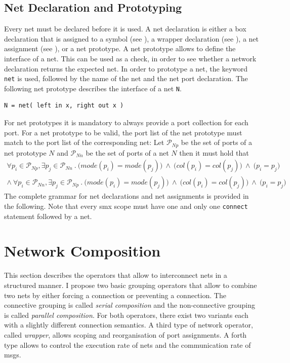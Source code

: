 \subsection{Net Declaration and Prototyping}
\label{sect_smx_nets_proto}
Every net must be declared before it is used.
A net declaration is either a box declaration that is assigned to a symbol (see \Sect{\ref{sect_smx_box}}), a wrapper declaration (see \Sect{\ref{sect_smx_network_wrapper}}), a net assignment (see \Sect{\ref{sect_smx_network_assign}}), or a net prototype.
A net prototype allows to define the interface of a net.
This can be used as a check, in order to see whether a network declaration returns the expected net.
In order to prototype a net, the keyword \texttt{net} is used, followed by the name of the net and the net port declaration.
The following net prototype describes the interface of a net \texttt{N}.
\begin{lstlisting}[numbers=none]
N = net( left in x, right out x )
\end{lstlisting}
For net prototypes it is mandatory to always provide a port collection for each port.
For a net prototype to be valid, the port list of the net prototype must match to the port list of the corresponding net:
Let $\mathcal{P}_{Np}$ be the set of ports of a net prototype $N$ and $\mathcal{P}_{Nn}$ be the set of ports of a net $N$ then it must hold that
\begin{multline}
    \label{eq_smx_proto}
    \forall p_i \in \mathcal{P}_{Np}, \exists p_j \in \mathcal{P}_{Nn} \ . \ \big (mode(p_i) = mode(p_j)\big ) \ \land \ \big (col(p_i) = col(p_j) \big ) \ \land \ \big (p_i = p_j \big ) \\
    \land \ \forall p_i \in \mathcal{P}_{Nn}, \exists p_j \in \mathcal{P}_{Np} \ . \ \big (mode(p_i) = mode(p_j)\big ) \ \land \ \big (col(p_i) = col(p_j) \big ) \ \land \ \big (p_i = p_j \big )
\end{multline}
The complete grammar for net declarations and net assignments is provided in the following.
Note that every \gls*{smx} scope must have one and only one \texttt{connect} statement followed by a net.



\section{Network Composition}
\label{sect_smx_network}
This section describes the operators that allow to interconnect nets in a structured manner.
I propose two basic grouping operators that allow to combine two nets by either forcing a connection or preventing a connection.
The connective grouping is called \emph{serial composition} and the non-connective grouping is called \emph{parallel composition}.
For both operators, there exist two variants each with a slightly different connection semantics.
A third type of network operator, called \emph{wrapper}, allows scoping and reorganisation of port assignments.
A forth type allows to control the execution rate of nets and the communication rate of \glspl*{msg}.

